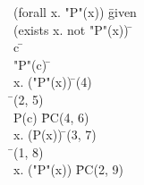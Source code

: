 \documentclass{article}
\begin{document}
\begin{proofbox}
\: \lnot (forall x. "P"(x)) \= \hbox{given} \\
\open
\: \lnot (exists x. not "P"(x)) \= \asm \\
\open
\: c \= \forallintroconst \\
\open
\: \lnot "P"(c) \= \asm \\
\: \exists x. (\lnot "P"(x)) \= \existsintro(4) \\
\: \bot \= \notelim(2, 5) \\
\close
\: P(c) \= PC(4, 6) \\
\close
\: \forall x. (P(x)) \= \forallintro(3, 7) \\
\: \bot \= \notelim(1, 8) \\
\close
\: \exists x. (\lnot "P"(x)) \= PC(2, 9) \\
\end{proofbox}
\end{document}
